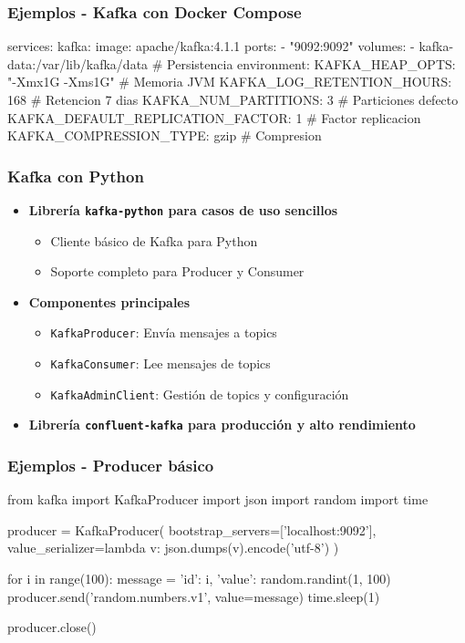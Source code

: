 \documentclass[aspectratio=169]{beamer}
\begin{document}
\begin{frame}[fragile]\frametitle{Ejemplos - Kafka con Docker Compose}
\begin{shcode}
    services:
      kafka:
        image: apache/kafka:4.1.1
        ports:
          - "9092:9092"
        volumes:
          - kafka-data:/var/lib/kafka/data    # Persistencia
        environment:
          KAFKA_HEAP_OPTS: "-Xmx1G -Xms1G"    # Memoria JVM
          KAFKA_LOG_RETENTION_HOURS: 168      # Retencion 7 dias
          KAFKA_NUM_PARTITIONS: 3             # Particiones defecto
          KAFKA_DEFAULT_REPLICATION_FACTOR: 1 # Factor replicacion
          KAFKA_COMPRESSION_TYPE: gzip        # Compresion
\end{shcode}
\end{frame}


\begin{frame}\frametitle{Kafka con Python}
\begin{itemize}
    \item \textbf{Librería \texttt{kafka-python} para casos de uso sencillos}
    \begin{itemize}
        \item Cliente básico de Kafka para Python
        \item Soporte completo para Producer y Consumer
    \end{itemize}
    \vspace{0.3cm}
    \item \textbf{Componentes principales}
    \begin{itemize}
        \item \texttt{KafkaProducer}: Envía mensajes a topics
        \item \texttt{KafkaConsumer}: Lee mensajes de topics
        \item \texttt{KafkaAdminClient}: Gestión de topics y configuración
    \end{itemize}
    \vspace{0.3cm}
    \item \textbf{Librería \texttt{confluent-kafka} para producción y alto rendimiento}
\end{itemize}
\end{frame}


\begin{frame}[fragile]\frametitle{Ejemplos - Producer básico}
\begin{code}
\begin{python3code}
from kafka import KafkaProducer
import json
import random
import time

producer = KafkaProducer(
    bootstrap_servers=['localhost:9092'],
    value_serializer=lambda v: json.dumps(v).encode('utf-8')
)

for i in range(100):
    message = {'id': i, 'value': random.randint(1, 100)}
    producer.send('random.numbers.v1', value=message)
    time.sleep(1)

producer.close()
\end{python3code}
\end{code}
\end{frame}
\end{document}
